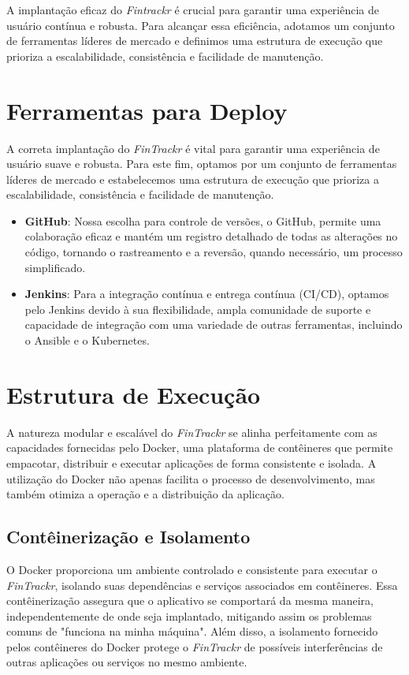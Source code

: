 A implantação eficaz do \textit{Fintrackr} é crucial para garantir uma experiência de usuário contínua e robusta. Para alcançar essa eficiência, adotamos um conjunto de ferramentas líderes de mercado e definimos uma estrutura de execução que prioriza a escalabilidade, consistência e facilidade de manutenção.

\section{Ferramentas para Deploy}

A correta implantação do \textit{FinTrackr} é vital para garantir uma experiência de usuário suave e robusta. Para este fim, optamos por um conjunto de ferramentas líderes de mercado e estabelecemos uma estrutura de execução que prioriza a escalabilidade, consistência e facilidade de manutenção.

\begin{itemize}
	\item \textbf{GitHub}: Nossa escolha para controle de versões, o GitHub, permite uma colaboração eficaz e mantém um registro detalhado de todas as alterações no código, tornando o rastreamento e a reversão, quando necessário, um processo simplificado.
	\item \textbf{Jenkins}: Para a integração contínua e entrega contínua (CI/CD), optamos pelo Jenkins devido à sua flexibilidade, ampla comunidade de suporte e capacidade de integração com uma variedade de outras ferramentas, incluindo o Ansible e o Kubernetes.
\end{itemize}

\section{Estrutura de Execução}

A natureza modular e escalável do \textit{FinTrackr} se alinha perfeitamente com as capacidades fornecidas pelo Docker, uma plataforma de contêineres que permite empacotar, distribuir e executar aplicações de forma consistente e isolada. A utilização do Docker não apenas facilita o processo de desenvolvimento, mas também otimiza a operação e a distribuição da aplicação.

\subsection{Contêinerização e Isolamento}

O Docker proporciona um ambiente controlado e consistente para executar o \textit{FinTrackr}, isolando suas dependências e serviços associados em contêineres. Essa contêinerização assegura que o aplicativo se comportará da mesma maneira, independentemente de onde seja implantado, mitigando assim os problemas comuns de "funciona na minha máquina". Além disso, a isolamento fornecido pelos contêineres do Docker protege o \textit{FinTrackr} de possíveis interferências de outras aplicações ou serviços no mesmo ambiente.

